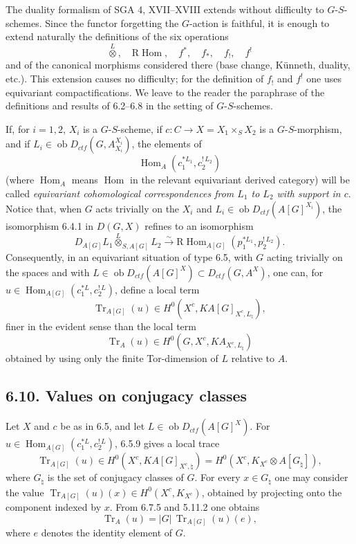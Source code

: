 \documentclass[12pt]{article}
\newcommand{\Hom}{\operatorname{Hom}}
\newcommand{\RHom}{\mathrm R\!\operatorname{Hom}}
\newcommand{\Tr}{\operatorname{Tr}}
\newcommand{\ob}{\operatorname{ob}}
\begin{document}
The duality formalism of SGA 4, XVII--XVIII extends without difficulty to
$G$-$S$-schemes. Since the functor forgetting the $G$-action is faithful, it is enough
to extend naturally the definitions of the six operations
\[
   \overset{L}{\otimes},\quad \RHom,\quad f^*,\quad f_*,\quad f_!,\quad f^!
\]
and of the canonical morphisms considered there (base change, Künneth, duality,
etc.). This extension causes no difficulty; for the definition of $f_!$ and $f^!$ one
uses equivariant compactifications. We leave to the reader the paraphrase of the
definitions and results of 6.2--6.8 in the setting of $G$-$S$-schemes.

If, for $i=1,2$, $X_i$ is a $G$-$S$-scheme, if
$c:C\to X=X_1\times_S X_2$ is a $G$-$S$-morphism, and if
$L_i\in\ob D_{ctf}(G,A_{X_i}^{X_i})$, the elements of
\[
     \Hom_A(c_1^{*L_1},c_2^{!\,L_2})
\]
(where $\Hom_A$ means $\Hom$ in the relevant equivariant derived category) will be
called \emph{equivariant cohomological correspondences from $L_1$ to $L_2$ with
support in $c$}. Notice that, when $G$ acts trivially on the $X_i$ and
$L_i\in\ob D_{ctf}(A[G]^{X_i})$, the isomorphism 6.4.1 in $D(G,X)$ refines to
an isomorphism
\[
D_{A[G]}L_1\overset{L}{\otimes}_{S,A[G]}L_2
\xrightarrow{\sim}
\RHom_{A[G]}(p_1^{*L_1},p_2^{!\,L_2}).
\]
Consequently, in an equivariant situation of type 6.5, with $G$ acting trivially on
the spaces and with $L\in\ob D_{ctf}(A[G]^X)\subset D_{ctf}(G,A^X)$, one can, for
$u\in\Hom_{A[G]}(c_1^{*L},c_2^{!\,L})$, define a local term
\[
     \Tr_{A[G]}(u)\in H^0(X^c,K A[G]_{X^c,L_\natural}),
\]
finer in the evident sense than the local term
\[
     \Tr_A(u)\in H^0(G,X^c,K A_{X^c,L_\natural})
\]
obtained by using only the finite Tor-dimension of $L$ relative to $A$.

\subsection*{6.10. Values on conjugacy classes}

Let $X$ and $c$ be as in 6.5, and let $L\in\ob D_{ctf}(A[G]^X)$. For
$u\in\Hom_{A[G]}(c_1^{*L},c_2^{!\,L})$, 6.5.9 gives a local trace
\begin{equation}\tag{6.10.1}
\Tr_{A[G]}(u)\in H^0(X^c,K A[G]_{X^c,\natural})
 = H^0(X^c,K_{X^c}\otimes A[G_\natural]),
\end{equation}
where $G_\natural$ is the set of conjugacy classes of $G$. For every
$x\in G_\natural$ one may consider the value
$\Tr_{A[G]}(u)(x)\in H^0(X^c,K_{X^c})$, obtained by projecting onto the component
indexed by $x$. From 6.7.5 and 5.11.2 one obtains
\begin{equation}\tag{6.10.2}
    \Tr_A(u)=|G|\,\Tr_{A[G]}(u)(e),
\end{equation}
where $e$ denotes the identity element of $G$.
\end{document}
